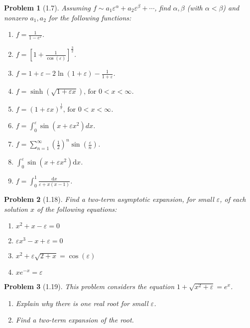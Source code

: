 \documentclass[11pt]{article}
\newcommand{\vep}{\varepsilon}
\theoremstyle{problemstyle}
\newtheorem{problem}{Problem}
\begin{document}
\newpage
\begin{problem}[1.7]
Assuming $f \sim a_1 \vep^\alpha + a_2 \vep^\beta + \cdots$, find $\alpha, \beta$
(with $\alpha < \beta$) and nonzero $a_1, a_2$ for the following functions:
\begin{enumerate}
  \item $\displaystyle f = \frac{1}{1 - e^{\vep}}$.
  \item $\displaystyle f = \left[1 + \frac{1}{\cos(\vep)}\right]^{\frac{3}{2}}$.
  \item $\displaystyle f = 1 + \vep - 2\ln\left(1 + \vep\right) - \frac{1}{1 + \vep}$.
  \item $\displaystyle f = \sinh\left(\sqrt{1 + \vep x}\right) \text{, for } 0 < x < \infty$.
  \item $\displaystyle f = \left(1 + \vep x\right)^{\frac{1}{\vep}} \text{, for } 0 < x < \infty$.
  \item $\displaystyle f = \int_{0}^{\vep} \sin\left(x + \vep x^{2}\right)dx$.
  \item $\displaystyle f = \displaystyle \sum_{n=1}^{\infty} \left(\frac{1}{2}\right)^n 
              \sin\left(\frac{\vep}{n}\right)$.
  \item $\displaystyle \int_0^\vep \sin(x + \vep x^2) \mathrm{d}x$.
  \item $\displaystyle f = \int_0^1 \frac{\mathrm{d}x}{\vep + x(x-1)}$.
\end{enumerate}
\end{problem}

\newpage
\begin{problem}[1.18]
  Find a two-term asymptotic expansion, for small $\vep$, of each solution $x$ of the
  following equations:
  \begin{enumerate}
    \item $x^2 + x - \vep = 0$
    \item[(e)] $\vep x^3 -x + \vep = 0$
    \item[(h)] $x^2 + \vep \sqrt{2+x} = \cos(\vep)$
    \item[(p)] $xe^{-x} = \vep$
  \end{enumerate}
\end{problem}

\newpage
\begin{problem}[1.19]
  This problem considers the equation $1 + \sqrt{x^2 + \vep} = e^x$.
  \begin{enumerate}
    \item Explain why there is one real root for small $\vep$.
    \item Find a two-term expansion of the root.
  \end{enumerate}
\end{problem}
\end{document}
